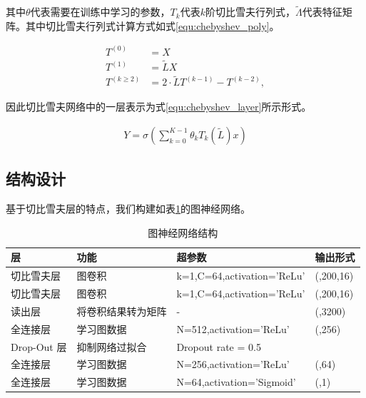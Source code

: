 其中$\theta$代表需要在训练中学习的参数，$T_k$代表$k$阶切比雪夫行列式，$\tilde{\Lambda}$代表特征矩阵。其中切比雪夫行列式计算方式如式\ref{equ:chebyshev_poly}。

\begin{equation}\label{equ:chebyshev_poly}
\begin{aligned}
T^{(0)} &= X \\
T^{(1)} &= \tilde L X \\
T^{(k \ge 2)} &= 2 \cdot \tilde L T^{(k - 1)} - T^{(k - 2)},
\end{aligned}\end{equation}

因此切比雪夫网络中的一层表示为式\ref{equ:chebyshev_layer}所示形式。

\begin{equation}\label{equ:chebyshev_layer}
\begin{aligned}
Y=\sigma \left(  \sum_{k=0}^{K-1}{\theta_k T_k (\tilde{L})}   x \right) 
\end{aligned}\end{equation}

\subsection{结构设计}

基于切比雪夫层的特点，我们构建如表\ref{tab:GNNstructure}的图神经网络。

\begin{table}[!h]
	\renewcommand{\arraystretch}{1.2}
	\centering\wuhao
	\caption{图神经网络结构} \label{tab:GNNstructure} \vspace{2mm}
	\begin{tabularx}{\textwidth} { 
   >{\centering\arraybackslash}X 
   >{\centering\arraybackslash}X
   >{\centering\arraybackslash}X 
   >{\centering\arraybackslash}X }
	\toprule[1.5pt]
	层          & 功能         & 超参数                              & 输出形式       \\
	\midrule[1pt]
	切比雪夫层      & 图卷积        & k=1,C=64,activation='ReLu' & (,200,16)  \\
切比雪夫层      & 图卷积        & k=1,C=64,activation='ReLu' & (,200,16)  \\
读出层        & 将卷积结果转为矩阵 & -                                & (,3200)    \\
全连接层       & 学习图数据      & N=512,activation='ReLu'          & (,256)     \\
Drop-Out 层 & 抑制网络过拟合    & Dropout rate = 0.5               &            \\
全连接层       & 学习图数据      & N=256,activation='ReLu'          & (,64)      \\
全连接层       & 学习图数据      & N=64,activation='Sigmoid'        & (,1)      \\
	\bottomrule[1.5pt]
	\end{tabularx}
\end{table}

